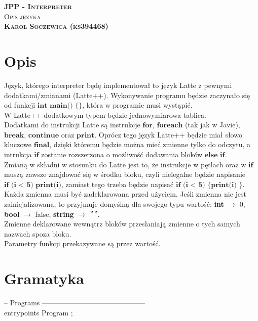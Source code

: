 \documentclass[a4paper]{article}
\begin{document}
\begin{center}
    \textsc{\textbf{\LARGE JPP - Interpreter}}\\
    \textsc{\large Opis języka}\\
    \textsc{\bf Karol Soczewica (ks394468)}
\end{center}

\vspace{0.8cm}

\section*{Opis}
Język, którego interpreter będę implementował to język Latte z pewnymi dodatkami/zmianami (Latte++).
Wykonywanie programu będzie zaczynało się od funkcji $\textbf{int main() \{\}}$, która w programie
musi wystąpić.\\
W Latte++ dodatkowym typem będzie jednowymiarowa tablica.\\ 
Dodatkami do instrukcji Latte są instrukcje $\textbf{for}$, $\textbf{foreach}$ (tak jak w Javie), 
$\textbf{break}$, $\textbf{continue}$ oraz $\textbf{print}$. Oprócz tego język Latte++ będzie miał
słowo kluczowe $\textbf{final}$, dzięki któremu będzie można mieć zmienne tylko do odczytu,
a intrukcja $\textbf{if}$ zostanie rozszerzona o możliwość dodawania bloków $\textbf{else if}$.\\
Zmianą w składni w stosunku do Latte jest to, że instrukcje w pętlach oraz w $\textbf{if}$ muszą
zawsze znajdować się w środku bloku, czyli nielegalne będzie napisanie $\textbf{if (i < 5) print(i)}$,
zamiast tego trzeba będzie napisać $\textbf{if (i < 5) \{ print(i) \}}$.\\
Każda zmienna musi być zadeklarowana przed użyciem. Jeśli zmienna nie jest zainicjalizowana, to
przyjmuje domyślną dla swojego typu wartość: \textbf{int} $\rightarrow$ 0, \textbf{bool} $\rightarrow$ false,
\textbf{string} $\rightarrow$ $"$$"$.\\
Zmienne deklarowane wewnątrz bloków przesłaniają zmienne o tych samych nazwach spoza bloku.\\
Parametry funkcji przekazywane są przez wartość.

\section*{Gramatyka}
-- Programs --------------------------------------------\\

entrypoints Program ;
\end{document}
